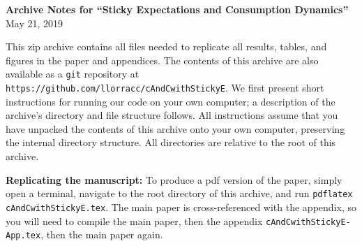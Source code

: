 \documentclass[12pt,pdftex,letterpaper]{article}
\begin{document}
\begin{center}
\textbf{Archive Notes for ``Sticky Expectations and Consumption Dynamics''} \\ May 21, 2019
\end{center}

This zip archive contains all files needed to replicate all results, tables, and figures in the paper and appendices.  The contents of this archive are also available as a \texttt{git} repository at \texttt{https://github.com/llorracc/cAndCwithStickyE}.  We first present short instructions for running our code on your own computer; a description of the archive's directory and file structure follows.  All instructions assume that you have unpacked the contents of this archive onto your own computer, preserving the internal directory structure.  All directories are relative to the root of this archive.

\vspace{0.5cm}

\noindent \textbf{Replicating the manuscript:} To produce a pdf version of the paper, simply open a terminal, navigate to the root directory of this archive, and run  \texttt{pdflatex cAndCwithStickyE.tex}.  The main paper is cross-referenced with the appendix, so you will need to compile the main paper, then the appendix \texttt{cAndCwithStickyE-App.tex}, then the main paper again.

\vspace{0.5cm}
\end{document}
